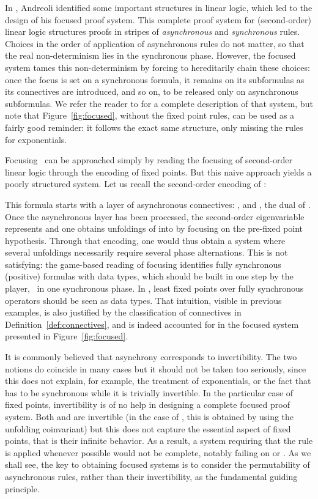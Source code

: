


\label{sec:foc_mumall}

In \cite{andreoli92jlc}, Andreoli identified some important structures
in linear logic, which led to the design of his focused proof system.
This complete proof system for (second-order) linear logic structures
proofs in stripes of \emph{asynchronous} and \emph{synchronous} rules.
Choices in the order of application of asynchronous rules do not matter,
so that the real non-determinism lies in the synchronous phase.
However, the focused system tames this non-determinism by forcing
to hereditarily chain these choices: once the focus is set on a
synchronous formula, it remains on its subformulas
as its connectives are introduced, and so on,
to be released only on asynchronous subformulas.
We refer the reader to \cite{andreoli92jlc} for a complete
description of that system,
but note that Figure~\ref{fig:focused}, without the fixed point rules,
can be used as a fairly good reminder:
it follows the exact same structure, only missing the rules for exponentials.

Focusing \mumall\ can be approached simply by reading the
focusing of second-order linear logic through the encoding of fixed points.
But this naive approach yields a poorly
structured system.
Let us recall the second-order encoding of :

This formula starts with a layer of asynchronous connectives:
,  and , the dual of .
Once the asynchronous layer has been 
processed, the second-order eigenvariable  represents 
and one obtains unfoldings of  into 
by focusing on the pre-fixed point hypothesis.
Through that encoding, one would thus obtain a system where several unfoldings
necessarily require several phase alternations.
This is not satisfying:
the game-based reading of focusing identifies fully synchronous (positive)
formulas with data types, which should be built in one step by the player,
\ie\ in one synchronous phase.
In \mumall, least fixed points over fully synchronous operators
should be seen as data types.
That intuition, visible in previous examples, is also justified
by the classification of connectives in Definition~\ref{def:connectives},
and is indeed accounted for in the focused system
presented in Figure~\ref{fig:focused}.

It is commonly believed that asynchrony corresponds to invertibility.
The two notions do coincide in many cases but it should not be taken too
seriously, since this does not explain, for example,
the treatment of exponentials,
or the fact that  has to be synchronous while it is trivially
invertible.
In the particular case of fixed points,
invertibility is of no help in designing a complete focused proof system.
Both  and  are invertible (in the case of , this is
obtained by using the unfolding coinvariant) but
this does not capture the essential aspect of fixed points, that is
their infinite behavior.
As a result, a system requiring that the  rule is applied
whenever possible would not be complete, notably failing
on  or .
As we shall see, the key to obtaining focused systems is to consider
the permutability of asynchronous rules, rather than their invertibility,
as the fundamental guiding principle.

